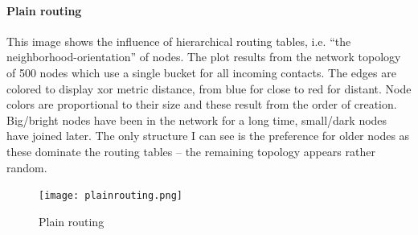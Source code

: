 \documentclass[a4paper,10pt,notitlepage]{article}
\begin{document}
\paragraph{Plain routing} This image shows the influence of hierarchical routing tables, i.e. ``the neighborhood-orientation'' of nodes.
The plot results from the network topology of 500 nodes which use a single bucket for all incoming contacts.
The edges are colored to display xor metric distance, from blue for close to red for distant.
Node colors are proportional to their size and these result from the order of creation.
Big/bright nodes have been in the network for a long time, small/dark nodes have joined later.
The only structure I can see is the preference for older nodes as these dominate the routing tables -- the remaining topology appears rather random.
\begin{figure}[htbp]
   \texttt{[image: plainrouting.png]}
   \caption{Plain routing}
\end{figure}
\end{document}
